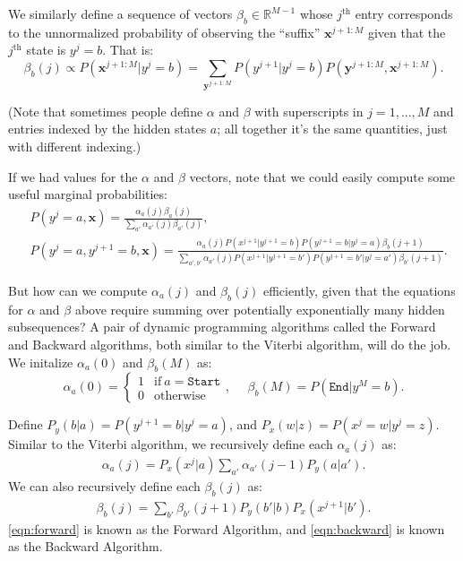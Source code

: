 \documentclass{article}
\newcommand{\x}{\textbf{x}}
\newcommand{\y}{\textbf{y}}
\newcommand{\T}{\top}
\newcommand{\END}{\texttt{End}}
\begin{document}
We similarly define a sequence of vectors $\beta_b \in \mathbb{R}^{M - 1}$ whose $j^\text{th}$ entry corresponds to the unnormalized probability of observing the ``suffix'' $\textbf{x}^{j+1:M}$ given that the $j^\text{th}$ state is $y^j = b$. That is:
$$\beta_b(j) \propto P(\x^{j+1:M}|y^j=b) = \sum_{\y^{j+1:M}} P(y^{j+1}|y^j=b)P(\y^{j+1:M},\x^{j+1:M}).$$

(Note that sometimes people define $\alpha$ and $\beta$ with superscripts in $j = 1, ..., M$ and entries indexed by the hidden states $a$; all together it's the same quantities, just with different indexing.)

If we had values for the $\alpha$ and $\beta$ vectors, note that we could easily compute some useful marginal probabilities:
\begin{eqnarray}
&P(y^j=a,\x) = \frac{\alpha_a(j)\beta_a(j)}{\sum_{a'} \alpha_{a'}(j)\beta_{a'}(j)},\label{eqn:E_step}\\
&P(y^j=a,y^{j+1}=b,\x) = \frac{\alpha_a(j)P(x^{j+1}|y^{j+1}=b)P(y^{j+1}=b|y^j=a)\beta_b(j+1)}{\sum_{a',b'}\alpha_{a'}(j)P(x^{j+1}|y^{j+1}=b')P(y^{j+1}=b'|y^j=a')\beta_{b'}(j + 1)}.\label{eqn:E_step2}
   \end{eqnarray}

But how can we compute $\alpha_a(j)$ and $\beta_b(j)$ efficiently, given that the equations for $\alpha$ and $\beta$ above require summing over potentially exponentially many hidden subsequences?  A pair of dynamic programming algorithms called the Forward and Backward algorithms, both similar to the Viterbi algorithm, will do the job. 
We initalize $\alpha_a(0)$ and $\beta_b(M)$ as:
$$\alpha_a(0) = \left\{\begin{array}{ll}
1 & \mbox{if}\ a=\texttt{Start}\\
0 & \mbox{otherwise}
\end{array}\right.,
\ \ \ \ \ \ 
\beta_b(M) = P(\END|y^M=b).
$$

Define $P_y(b|a) = P(y^{j+1}=b|y^j=a)$, and $P_x(w|z) = P(x^j=w|y^j=z)$. Similar to the Viterbi algorithm, we recursively define each $\alpha_a(j)$ as:
\begin{eqnarray}\alpha_a(j) = P_x(x^j|a)\sum_{a'} \alpha_{a'}(j - 1)P_y(a|a').\label{eqn:forward}\end{eqnarray}
We can also recursively define each $\beta_b(j)$ as:
\begin{eqnarray}\beta_b(j) = \sum_{b'} \beta_{b'}(j + 1)P_y(b'|b)P_x(x^{j+1}|b').\label{eqn:backward}\end{eqnarray}
\eqref{eqn:forward} is known as the Forward Algorithm, and \eqref{eqn:backward} is known as the Backward Algorithm.
\end{document}
